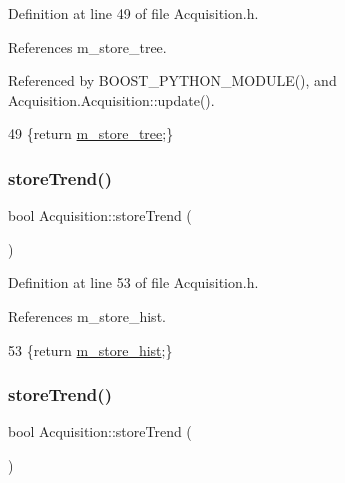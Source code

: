 Definition at line 49 of file Acquisition.\+h.



References m\+\_\+store\+\_\+tree.



Referenced by B\+O\+O\+S\+T\+\_\+\+P\+Y\+T\+H\+O\+N\+\_\+\+M\+O\+D\+U\+L\+E(), and Acquisition.\+Acquisition\+::update().


\begin{DoxyCode}
49 \{\textcolor{keywordflow}{return} \hyperlink{classAcquisition_aca2143e9135e25554e58327475a767c5}{m\_store\_tree};\}
\end{DoxyCode}
\mbox{\label{classAcquisition_a5af693448daef6e9e054ab7f1aa50784}} 
\subsubsection{\texorpdfstring{store\+Trend()}{storeTrend()}\hspace{0.1cm}{\footnotesize\ttfamily [1/2]}}
{\footnotesize\ttfamily bool Acquisition\+::store\+Trend (\begin{DoxyParamCaption}{ }\end{DoxyParamCaption})\hspace{0.3cm}{\ttfamily [inline]}}



Definition at line 53 of file Acquisition.\+h.



References m\+\_\+store\+\_\+hist.


\begin{DoxyCode}
53 \{\textcolor{keywordflow}{return} \hyperlink{classAcquisition_a08f70edd83751dbdab4c8190dc4b9188}{m\_store\_hist};\}
\end{DoxyCode}
\mbox{\label{classAcquisition_a5af693448daef6e9e054ab7f1aa50784}} 
\subsubsection{\texorpdfstring{store\+Trend()}{storeTrend()}\hspace{0.1cm}{\footnotesize\ttfamily [2/2]}}
{\footnotesize\ttfamily bool Acquisition\+::store\+Trend (\begin{DoxyParamCaption}{ }\end{DoxyParamCaption})\hspace{0.3cm}{\ttfamily [inline]}}



